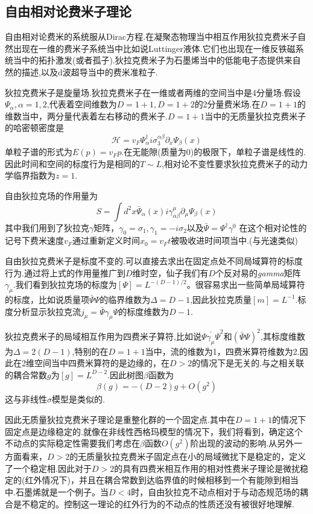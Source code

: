 \documentclass{ctexart}
\begin{document}
\subsection{自由相对论费米子理论}
自由相对论费米的系统服从Dirac方程.在凝聚态物理当中相互作用狄拉克费米子自然出现在一维的费米子系统当中比如说Luttinger液体.它们也出现在一维反铁磁系统当中的拓扑激发(或者孤子).狄拉克费米子为石墨烯当中的低能电子态提供来自然的描述,以及d波超导当中的费米准粒子.\par 
狄拉克费米子是旋量场.狄拉克费米子在一维或者两维的空间当中是4分量场.假设$\Psi_\alpha,\alpha=1,2$,代表着空间维数为$D=1+1,D=1+2$的2分量费米场.在$D=1+1$的维数当中，两分量代表着左右移动的费米子.$D=1+1$当中的无质量狄拉克费米子的哈密顿密度是
$$\mathcal{H}=v_F\Psi_{\alpha}^\dagger i\sigma_3^{\alpha\beta}\partial_x\Psi_{\beta}(x)$$
单粒子谱的形式为$E(p)=v_Fp$.在无能隙(质量为0)的极限下，单粒子谱是线性的.因此时间和空间的标度行为是相同的$T\sim L$,相对论不变性要求狄拉克费米子的动力学临界指数为$z=1$.\par 
自由狄拉克场的作用量为
$$S=\int d^2 x\bar{\Psi}_\alpha(x)i\gamma_{\alpha\beta}^{\mu}\partial_\mu\Psi_\beta(x)$$
其中我们用到了狄拉克$\gamma$矩阵，$\gamma_0=\sigma_1,\gamma_1=-i\sigma_2$以及$\bar{\Psi}=\Psi^{\dagger}\gamma^0$
在这个相对论性的记号下费米速度$v_F$通过重新定义时间$x_0=v_F t$被吸收进时间项当中.(与光速类似)\par 
自由狄拉克费米子是标度不变的.可以直接去求出在固定点处不同局域算符的标度行为.通过将上式的作用量推广到$D$维时空，仙子我们有$D$个反对易的\textit{gamma}矩阵$\gamma_\mu$.我们看到狄拉克场的标度为$[\Psi]=L^{-(D-1)/2}$。很容易求出一些简单局域算符的标度，比如说质量项$\bar{\Psi}\Psi$的临界维数为$\Delta=D-1$,因此狄拉克质量$[m]=L^{-1}$.标度分析显示狄拉克流$j_\mu=\bar{\Psi}\gamma_\mu\Psi$的标度维数为$D-1$.\par 狄拉克费米子的局域相互作用为四费米子算符,比如说$\bar{\Psi\gamma_\mu\Psi}^2$和$(\bar{\Psi}\Psi)^2$,其标度维数为$\Delta=2(D-1)$,特别的在$D=1+1$当中，流的维数为1，四费米算符维数为2.因此在2维空间当中四费米算符的是边缘的，在$D>2$的情况下是无关的.与之相关联的耦合常数$g$为$[g]=L^{D-2}$.因此树图$\beta$函数为
$$\beta(g)=-(D-2)g+O(g^2)$$
这与非线性$\sigma$模型是类似的.\par 
因此无质量狄拉克费米子理论是重整化群的一个固定点.其中在$D=1+1$的情况下固定点是边缘稳定的.就像在非线性西格玛模型的情况下，我们将看到，确定这个不动点的实际稳定性需要我们考虑在$\beta$函数$O(g^2)$阶出现的波动的影响.从另外一方面看来，$D>2$的无质量狄拉克费米子固定点在小的局域微扰下是稳定的，定义了一个稳定相.因此对于$D>2$的具有四费米相互作用的相对性费米子理论是微扰稳定的(红外情况下)，并且在耦合常数到达临界值的时候相移到一个有能隙到相当中.石墨烯就是一个例子。当$D < 4$时，自由狄拉克不动点相对于与动态规范场的耦合是不稳定的。控制这一理论的红外行为的不动点的性质还没有被很好地理解.\par 
\end{document}
